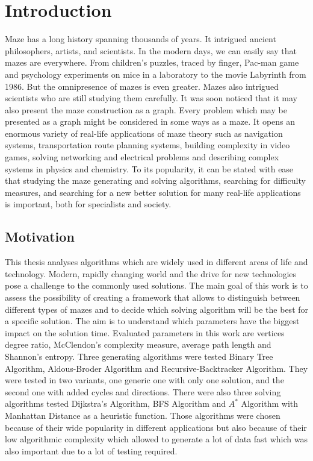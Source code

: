 \chapter{Introduction}\label{cha:Introduction}
Maze has a long history spanning thousands of years. It intrigued ancient philosophers, artists, and scientists. In the modern days, we can easily say
that mazes are everywhere. From children's puzzles, traced by finger, Pac-man game and psychology experiments on mice in a laboratory to the movie Labyrinth
from 1986. But the omnipresence of mazes is even greater. Mazes also intrigued scientists who are still studying them carefully. It was soon noticed that
it may also present the maze construction as a graph. Every problem which may be presented as a graph might be considered in some ways as a maze. It opens 
an enormous variety of real-life applications of maze theory such as navigation systems, transportation route planning systems, building complexity in video
games, solving networking and electrical problems and describing complex systems in physics and chemistry. To its popularity, it can be stated with ease that 
studying the maze generating and solving algorithms, searching for difficulty measures, and searching for a new better solution for many real-life applications
is important, both for specialists and society.
\section{Motivation}
This thesis analyses algorithms which are widely used in different areas of life and technology. Modern, rapidly changing world and the drive for
new technologies pose a challenge to the commonly used solutions. The main goal of this work is to assess the possibility of creating a framework that allows
to distinguish between different types of mazes and to decide which solving algorithm will be the best for a specific solution. The aim is to understand which parameters
have the biggest impact on the solution time. Evaluated parameters in this work are vertices degree ratio, McClendon's complexity measure, average path length and Shannon's entropy.
Three generating algorithms were tested Binary Tree Algorithm, Aldous-Broder Algorithm and Recursive-Backtracker Algorithm. They were tested in two variants, one generic one with only one solution, 
and the second one with added cycles and directions. There were also three solving algorithms tested Dijkstra's Algorithm, BFS Algorithm and $A^*$ Algorithm 
with Manhattan Distance as a heuristic function. Those algorithms were chosen because of their wide popularity in different applications but also because of their low
algorithmic complexity which allowed to generate a lot of data fast which was also important due to a lot of testing required. 

